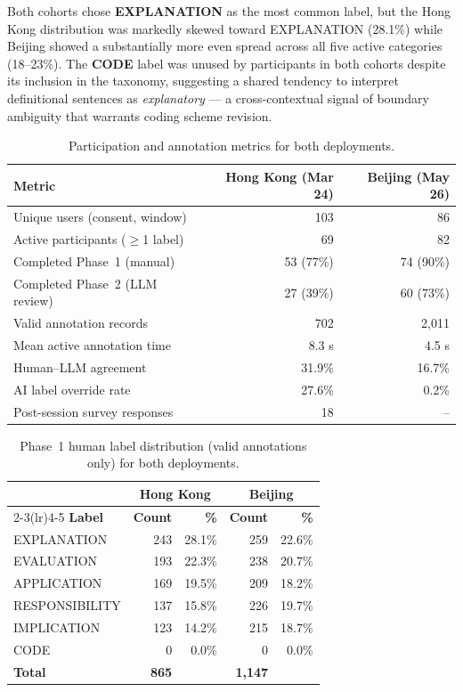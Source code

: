 \documentclass[fleqn,10pt]{JLA_article}
\begin{document}
Both cohorts chose \textbf{EXPLANATION} as the most common label, but the Hong Kong
distribution was markedly skewed toward EXPLANATION (28.1\%) while Beijing showed a
substantially more even spread across all five active categories (18--23\%).
The \textbf{CODE} label was unused by participants in both cohorts despite its inclusion
in the taxonomy, suggesting a shared tendency to interpret definitional sentences as
\emph{explanatory} — a cross-contextual signal of boundary ambiguity that warrants
coding scheme revision.

\begin{table}[hbt]
\caption{Participation and annotation metrics for both deployments.}
\label{tab:cohorts}
\centering
\small
\begin{tabular}{lrr}
\toprule
\textbf{Metric} & \textbf{Hong Kong (Mar 24)} & \textbf{Beijing (May 26)} \\
\midrule
Unique users (consent, window)   & 103    & 86    \\
Active participants ($\ge$1 label) & 69   & 82    \\
Completed Phase~1 (manual)       & 53 (77\%)  & 74 (90\%) \\
Completed Phase~2 (LLM review)   & 27 (39\%)  & 60 (73\%) \\
Valid annotation records         & 702   & 2,011 \\
Mean active annotation time      & 8.3 s & 4.5 s \\
Human--LLM agreement             & 31.9\% & 16.7\% \\
AI label override rate           & 27.6\% & 0.2\% \\
Post-session survey responses    & 18    & --    \\
\bottomrule
\end{tabular}
\end{table}

\begin{table}[hbt]
\caption{Phase~1 human label distribution (valid annotations only) for both deployments.}
\label{tab:labels}
\centering
\begin{tabular}{lrrrr}
\toprule
& \multicolumn{2}{c}{\textbf{Hong Kong}} & \multicolumn{2}{c}{\textbf{Beijing}} \\
\cmidrule(lr){2-3}\cmidrule(lr){4-5}
\textbf{Label} & \textbf{Count} & \textbf{\%} & \textbf{Count} & \textbf{\%} \\
\midrule
EXPLANATION    & 243 & 28.1\% & 259 & 22.6\% \\
EVALUATION     & 193 & 22.3\% & 238 & 20.7\% \\
APPLICATION    & 169 & 19.5\% & 209 & 18.2\% \\
RESPONSIBILITY & 137 & 15.8\% & 226 & 19.7\% \\
IMPLICATION    & 123 & 14.2\% & 215 & 18.7\% \\
CODE           &   0 &  0.0\% &   0 &  0.0\% \\
\midrule
\textbf{Total} & \textbf{865} & & \textbf{1,147} & \\
\bottomrule
\end{tabular}
\end{table}
\end{document}
